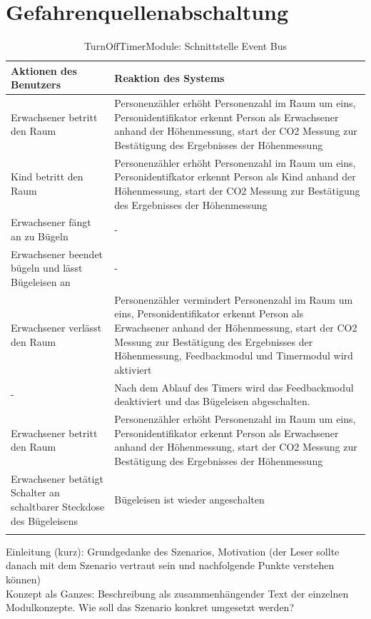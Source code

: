 \section{Gefahrenquellenabschaltung}

\begin{longtabu} to 
	\hline
	\textbf{Aktionen des Benutzers}									& \textbf{Reaktion des Systems} \\
	\hline
	\endhead
	Erwachsener betritt den Raum	& Personenzähler erhöht Personenzahl im Raum um eins, Personidentifikator erkennt Person als Erwachsener anhand der Höhenmessung, start der CO2 Messung zur Bestätigung des Ergebnisses der Höhenmessung \\ 
	\hline
	Kind betritt den Raum	& Personenzähler erhöht Personenzahl im Raum um eins, Personidentifkator erkennt Person als Kind anhand der Höhenmessung, start der CO2 Messung zur Bestätigung des Ergebnisses der Höhenmessung \\
	\hline
	Erwachsener fängt an zu Bügeln	& - \\
	\hline
	Erwachsener beendet bügeln und lässt Bügeleisen an	& - \\
	\hline
	Erwachsener verlässt den Raum	& Personenzähler vermindert Personenzahl im Raum um eins, Personidentifikator erkennt Person als Erwachsener anhand der Höhenmessung, start der CO2 Messung zur Bestätigung des Ergebnisses der Höhenmessung, Feedbackmodul und Timermodul wird aktiviert \\
	\hline
	-	& Nach dem Ablauf des Timers wird das Feedbackmodul deaktiviert und das Bügeleisen abgeschalten. \\
	\hline
	Erwachsener betritt den Raum	& Personenzähler erhöht Personenzahl im Raum um eins, Personidentifikator erkennt Person als Erwachsener anhand der Höhenmessung, start der CO2 Messung zur Bestätigung des Ergebnisses der Höhenmessung \\
	\hline
	Erwachsener betätigt Schalter an schaltbarer Steckdose des Bügeleisens 	& Bügeleisen ist wieder angeschalten \\
	\hline
	\caption{TurnOffTimerModule: Schnittstelle Event Bus}
\end{longtabu}


Einleitung (kurz): Grundgedanke des Szenarios, Motivation (der Leser sollte danach mit dem Szenario vertraut sein und nachfolgende Punkte verstehen können)\\

Konzept als Ganzes: Beschreibung als zusammenhängender Text der einzelnen Modulkonzepte. Wie soll das Szenario konkret umgesetzt werden?\\

